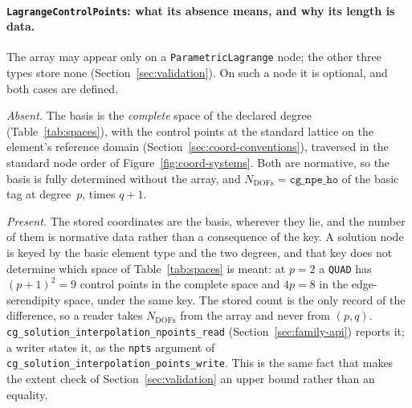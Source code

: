 \documentclass[11pt,letterpaper]{article}
\newif\ifvfourdraft
\newenvironment{v4block}{\ifvfourdraft\color{v4violet}\fi\ignorespaces}{\par}
\newcommand{\vfourmark}{\ifvfourdraft\textcolor{v4violet}{\textbf{[v4]}}\ \fi}
\begin{document}
\begin{v4block}
\paragraph{\vfourmark \texttt{LagrangeControlPoints}: what its absence means,
and why its length is data.}
\label{sec:lagrange-required}
The array may appear only on a \texttt{ParametricLagrange} node; the other three
types store none (Section~\ref{sec:validation}).  On such a node it is optional,
and both cases are defined.

\emph{Absent.}  The basis is the \emph{complete} space of the declared degree
(Table~\ref{tab:spaces}), with the control points at the standard lattice on the
element's reference domain (Section~\ref{sec:coord-conventions}), traversed in
the standard node order of Figure~\ref{fig:coord-systems}.  Both are normative,
so the basis is fully determined without the array, and
$N_\mathrm{DOFs} = \texttt{cg\_npe\_ho}$ of the basic tag at degree~$p$, times
$q+1$.

\emph{Present.}  The stored coordinates are the basis, wherever they lie, and
the number of them is normative data rather than a consequence of the key.  A
solution node is keyed by the basic element type and the two degrees, and that
key does not determine which space of Table~\ref{tab:spaces} is meant: at $p=2$ a
\texttt{QUAD} has $(p+1)^2 = 9$ control points in the complete space and $4p = 8$
in the edge-serendipity space, under the same key.  The stored count is the only
record of the difference, so a reader takes $N_\mathrm{DOFs}$ from the array and
never from $(p, q)$.  \texttt{cg\_solution\_interpolation\_npoints\_read}
(Section~\ref{sec:family-api}) reports it; a writer states it, as the
\texttt{npts} argument of \texttt{cg\_solution\_interpolation\_points\_write}.
This is the same fact that makes the extent check of Section~\ref{sec:validation}
an upper bound rather than an equality.
\end{v4block}
\end{document}
